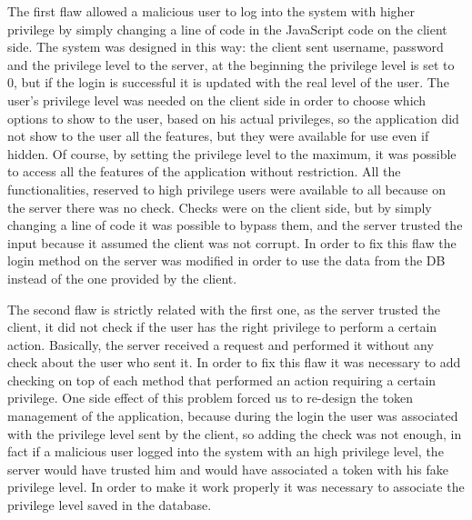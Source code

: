 The first flaw allowed a malicious user to log into the system with higher privilege by simply changing a line of code in the JavaScript code on the client side.\newline
The system was designed in this way: the client sent username, password and the privilege level to the server, at the beginning the privilege level is set to 0, but if the login is successful it is updated with the real level of the user.\newline
The user’s privilege level was needed on the client side in order to choose which options to show to the user, based on his actual privileges, so the application did not show to the user all the features, but they were available for use even if hidden.\newline
Of course, by setting the privilege level to the maximum, it was possible to access all the features of the application without restriction.\newline
All the functionalities, reserved to high privilege users were available to all because on the server there was no check.\newline
Checks were on the client side, but by simply changing a line of code it was possible to bypass them, and the server trusted the input because it assumed the client was not corrupt.\newline
In order to fix this flaw the login method on the server was modified in order to use the data from the DB instead of the one provided by the client.\newline

The second flaw is strictly related with the first one, as the server trusted the client, it did not check if the user has the right privilege to perform a certain action.\newline
Basically, the server received a request and performed it without any check about the user who sent it.\newline
In order to fix this flaw it was necessary to add checking on top of each method that performed an action requiring a certain privilege.\newline
One side effect of this problem forced us to re-design the token management of the application, because during the login the user was associated with the privilege level sent by the client, so adding the check was not enough, in fact if a malicious user logged into the system with an high privilege level, the server would have trusted him and would have associated a token with his fake privilege level.\newline
In order to make it work properly it was necessary to associate the privilege level saved in the database.\newline

